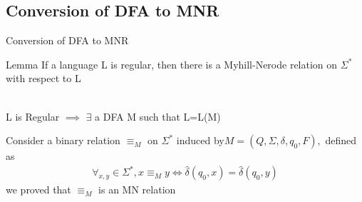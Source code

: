 \documentclass{beamer}
\begin{document}
\subsection{Conversion of DFA  to MNR}	
\begin{frame}{Conversion of DFA  to MNR}
	\begin{block}{Lemma}
	If a language L is regular, then there is a Myhill-Nerode relation on $\Sigma^*$ with
	respect to L
	\end{block}
\proofname \\

L is Regular $\implies$ $\exists$ a DFA M such that L=L(M)
\par Consider a binary relation $\equiv_M$ on $\Sigma^*$ induced by$ M=(Q,\Sigma , \delta , q_0,F ) ,$ defined as
\begin{eqnarray*}
\forall_{x,y} \in \Sigma^*, x\equiv_M y \Leftrightarrow \hat{\delta}(q_0,x)=\hat{\delta}(q_0,y)
\end{eqnarray*}
we proved that $\equiv_M$ is an MN relation
\end{frame}
\end{document}
